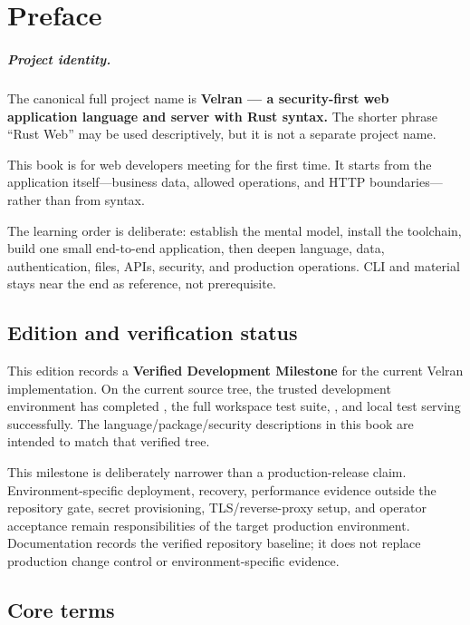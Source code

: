 \chapter*{Preface}

\paragraph{Project identity.} The canonical full project name is \textbf{Velran --- a security-first web application language and server with Rust syntax.} The shorter phrase ``Rust Web'' may be used descriptively, but it is not a separate project name.


This book is for web developers meeting \velran{} for the first time. It starts from the application itself---business data, allowed operations, and HTTP boundaries---rather than from syntax.

The learning order is deliberate: establish the mental model, install the toolchain, build one small end-to-end application, then deepen language, data, authentication, files, APIs, security, and production operations. CLI and  material stays near the end as reference, not prerequisite.


\section*{Edition and verification status}

This edition records a \textbf{Verified Development Milestone} for the current Velran implementation. On the current source tree, the trusted development environment has completed , the full workspace test suite, , and local test serving successfully. The language/package/security descriptions in this book are intended to match that verified tree.

This milestone is deliberately narrower than a production-release claim. Environment-specific deployment, recovery, performance evidence outside the repository gate, secret provisioning, TLS/reverse-proxy setup, and operator acceptance remain responsibilities of the target production environment. Documentation records the verified repository baseline; it does not replace production change control or environment-specific evidence.

\section*{Core terms}

